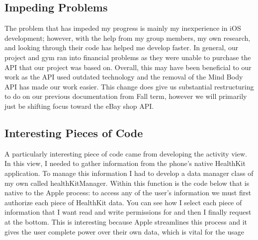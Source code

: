 \documentclass[a4paper]{article}
\begin{document}
\subsection{Impeding Problems}

The problem that has impeded my progress is mainly my inexperience in iOS development; however, with the help from my group members, my own research, and looking through their code has helped me develop faster. In general, our project and gym ran into financial problems as they were unable to purchase the API that our project was based on. Overall, this may have been beneficial to our work as the API used outdated technology and the removal of the Mind Body API has made our work easier. This change does give us substantial restructuring to do on our previous documentation from Fall term, however we will primarily just be shifting focus toward the eBay shop API.

\subsection{Interesting Pieces of Code}

A particularly interesting piece of code came from developing the activity view. In this view, I needed to gather information from the phone's native HealthKit application. To manage this information I had to develop a data manager class of my own called healthKitManager. Within this function is the code below that is native to the Apple process: to access any of the user's information we must first authorize each piece of HealthKit data. You can see how I select each piece of information that I want read and write permissions for and then I finally request at the bottom. This is interesting because Apple streamlines this process and it gives the user complete power over their own data, which is vital for the usage
\end{document}
